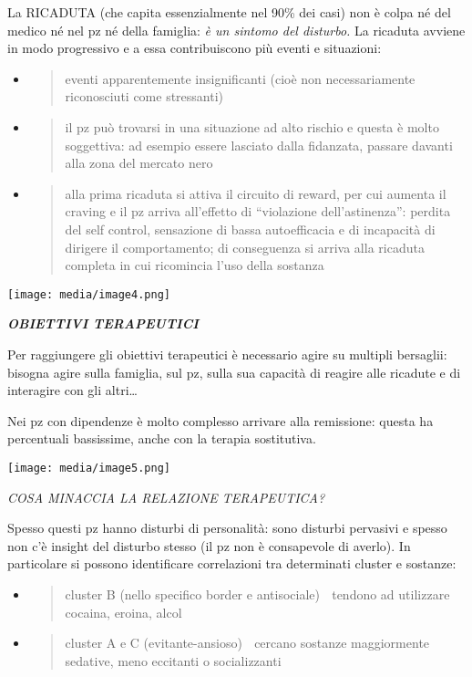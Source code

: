\documentclass[]{article}
\begin{document}
La RICADUTA (che capita essenzialmente nel 90\% dei casi) non è colpa né
del medico né nel pz né della famiglia: \emph{è un sintomo del
disturbo.} La ricaduta avviene in modo progressivo e a essa
contribuiscono più eventi e situazioni:

\begin{itemize}
\item
  \begin{quote}
  eventi apparentemente insignificanti (cioè non necessariamente
  riconosciuti come stressanti)
  \end{quote}
\item
  \begin{quote}
  il pz può trovarsi in una situazione ad alto rischio e questa è molto
  soggettiva: ad esempio essere lasciato dalla fidanzata, passare
  davanti alla zona del mercato nero
  \end{quote}
\item
  \begin{quote}
  alla prima ricaduta si attiva il circuito di reward, per cui aumenta
  il craving e il pz arriva all'effetto di ``violazione
  dell'astinenza'': perdita del self control, sensazione di bassa
  autoefficacia e di incapacità di dirigere il comportamento; di
  conseguenza si arriva alla ricaduta completa in cui ricomincia l'uso
  della sostanza
  \end{quote}
\end{itemize}

\texttt{[image: media/image4.png]}

\textbf{\emph{OBIETTIVI TERAPEUTICI}}

Per raggiungere gli obiettivi terapeutici è necessario agire su multipli
bersaglii: bisogna agire sulla famiglia, sul pz, sulla sua capacità di
reagire alle ricadute e di interagire con gli altri\ldots{}

Nei pz con dipendenze è molto complesso arrivare alla remissione: questa
ha percentuali bassissime, anche con la terapia sostitutiva.

\texttt{[image: media/image5.png]}

\emph{COSA MINACCIA LA RELAZIONE TERAPEUTICA?}

Spesso questi pz hanno disturbi di personalità: sono disturbi pervasivi
e spesso non c'è insight del disturbo stesso (il pz non è consapevole di
averlo). In particolare si possono identificare correlazioni tra
determinati cluster e sostanze:

\begin{itemize}
\item
  \begin{quote}
  cluster B (nello specifico border e antisociale)  tendono ad
  utilizzare cocaina, eroina, alcol
  \end{quote}
\item
  \begin{quote}
  cluster A e C (evitante-ansioso)  cercano sostanze maggiormente
  sedative, meno eccitanti o socializzanti
  \end{quote}
\end{itemize}
\end{document}
